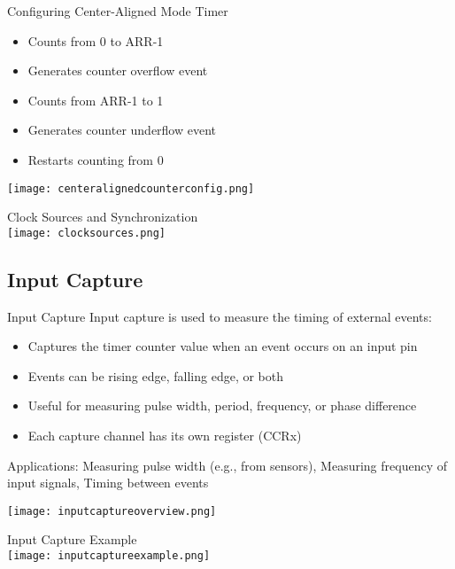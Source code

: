 \begin{example2}{Configuring Center-Aligned Mode Timer}
    \begin{itemize}
        \item Counts from 0 to ARR-1
        \item Generates counter overflow event
        \item Counts from ARR-1 to 1
        \item Generates counter underflow event
        \item Restarts counting from 0
    \end{itemize}

    \texttt{[image: centeralignedcounterconfig.png]}
\end{example2}

\begin{concept}{Clock Sources and Synchronization}\\
    \texttt{[image: clocksources.png]}
\end{concept}


\raggedcolumns
\pagebreak

\subsection{Input Capture}

\begin{definition}{Input Capture}
Input capture is used to measure the timing of external events:
\begin{itemize}
    \item Captures the timer counter value when an event occurs on an input pin
    \item Events can be rising edge, falling edge, or both
    \item Useful for measuring pulse width, period, frequency, or phase difference
    \item Each capture channel has its own register (CCRx)
\end{itemize}
Applications: Measuring pulse width (e.g., from sensors), Measuring frequency of input signals, Timing between events

\texttt{[image: inputcaptureoverview.png]}
\end{definition}

\begin{example2}{Input Capture Example}\\
    \texttt{[image: inputcaptureexample.png]}
\end{example2}

